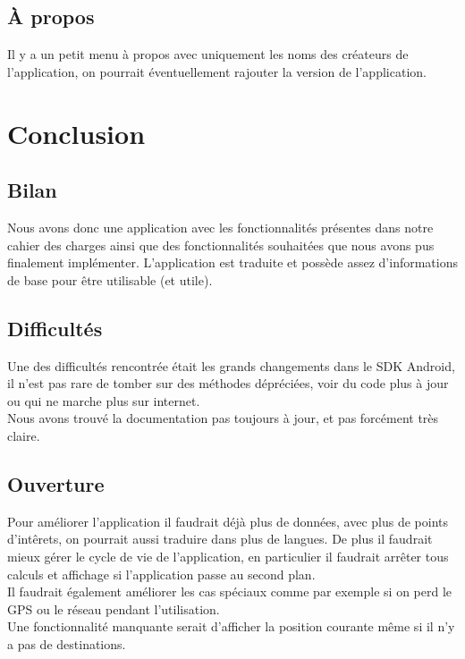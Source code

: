 \documentclass{article}
\begin{document}
	\subsection{À propos}
	Il y a un petit menu à propos avec uniquement les noms des créateurs de l'application, on pourrait éventuellement rajouter la version de l'application. 
	
	\section{Conclusion}
		\subsection{Bilan}
		Nous avons donc une application avec les fonctionnalités présentes dans notre cahier des charges ainsi que des fonctionnalités souhaitées que nous avons pus finalement implémenter.
		L'application est traduite et possède assez d'informations de base pour être utilisable (et utile). \\
		
		\subsection{Difficultés}
		Une des difficultés rencontrée était les grands changements dans le SDK Android, il n'est pas rare de tomber sur des méthodes dépréciées, voir du code plus à jour ou qui ne marche plus sur internet. \\
		Nous avons trouvé la documentation pas toujours à jour, et pas forcément très claire. \\
		
		\subsection{Ouverture}
		Pour améliorer l'application il faudrait déjà plus de données, avec plus de points d'intêrets, on pourrait aussi traduire dans plus de langues.
		De plus il faudrait mieux gérer le cycle de vie de l'application, en particulier il faudrait arrêter tous calculs et affichage si l'application passe au second plan. \\
		Il faudrait également améliorer les cas spéciaux comme par exemple si on perd le GPS ou le réseau pendant l'utilisation. \\
		Une fonctionnalité manquante serait d'afficher la position courante même si il n'y a pas de destinations. \\
\end{document}
